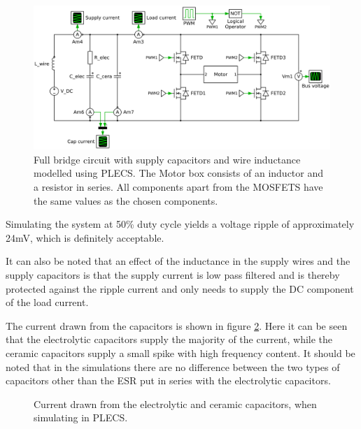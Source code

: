 \begin{figure}[h]
	\centering
	\includegraphics[width=1\linewidth]{graphics/plecs_schem.png}
	\caption[Full bridge circuit modelled in PLECS.]{Full bridge circuit with supply capacitors and wire inductance modelled using PLECS. The Motor box consists of an inductor and a resistor in series. All components apart from the MOSFETS have the same values as the chosen components.}
	\label{fig:plecs_schem}
\end{figure}	

Simulating the system at 50\% duty cycle yields a voltage ripple of approximately 24mV, which is definitely acceptable. 

It can also be noted that an effect of the inductance in the supply wires and the supply capacitors is that the supply current is low pass filtered and is thereby protected against the ripple current and only needs to supply the DC component of the load current.

The current drawn from the capacitors is shown in figure \ref{fig:cap_currents}.
Here it can be seen that the electrolytic capacitors supply the majority of the current, while the ceramic capacitors supply a small spike with high frequency content.
It should be noted that in the simulations there are no difference between the two types of capacitors other than the ESR put in series with the electrolytic capacitors. 

\begin{figure}[h]
	\centering
	
	\caption[Capacitor current simulation in PLECS.]{Current drawn from the electrolytic and ceramic capacitors, when simulating in PLECS. }
	\label{fig:cap_currents}
\end{figure}

